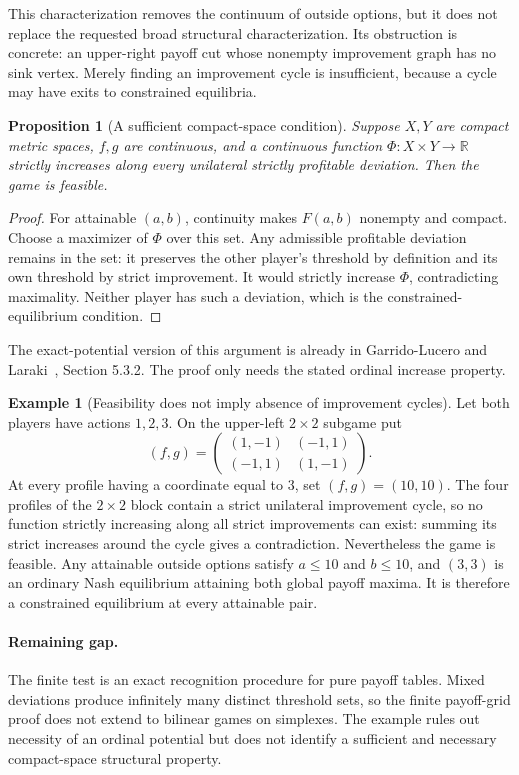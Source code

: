 \documentclass[11pt]{article}
\newtheorem{proposition}{Proposition}
\theoremstyle{definition}
\newtheorem{example}{Example}
\theoremstyle{remark}
\begin{document}
This characterization removes the continuum of outside options, but it does not replace the requested broad structural characterization. Its obstruction is concrete: an upper-right payoff cut whose nonempty improvement graph has no sink vertex. Merely finding an improvement cycle is insufficient, because a cycle may have exits to constrained equilibria.

\begin{proposition}[A sufficient compact-space condition]
Suppose $X,Y$ are compact metric spaces, $f,g$ are continuous, and a continuous function $\Phi:X\times Y\to\mathbb R$ strictly increases along every unilateral strictly profitable deviation. Then the game is feasible.
\end{proposition}
\begin{proof}
For attainable $(a,b)$, continuity makes $F(a,b)$ nonempty and compact. Choose a maximizer of $\Phi$ over this set. Any admissible profitable deviation remains in the set: it preserves the other player's threshold by definition and its own threshold by strict improvement. It would strictly increase $\Phi$, contradicting maximality. Neither player has such a deviation, which is the constrained-equilibrium condition.
\end{proof}

The exact-potential version of this argument is already in Garrido-Lucero and Laraki~\cite{source}, Section 5.3.2. The proof only needs the stated ordinal increase property.

\begin{example}[Feasibility does not imply absence of improvement cycles]
Let both players have actions $1,2,3$. On the upper-left $2\times2$ subgame put
\[
 (f,g)=\begin{pmatrix}(1,-1)&(-1,1)\\(-1,1)&(1,-1)\end{pmatrix}.
\]
At every profile having a coordinate equal to $3$, set $(f,g)=(10,10)$. The four profiles of the $2\times2$ block contain a strict unilateral improvement cycle, so no function strictly increasing along all strict improvements can exist: summing its strict increases around the cycle gives a contradiction. Nevertheless the game is feasible. Any attainable outside options satisfy $a\leq10$ and $b\leq10$, and $(3,3)$ is an ordinary Nash equilibrium attaining both global payoff maxima. It is therefore a constrained equilibrium at every attainable pair.
\end{example}

\paragraph{Remaining gap.}
The finite test is an exact recognition procedure for pure payoff tables. Mixed deviations produce infinitely many distinct threshold sets, so the finite payoff-grid proof does not extend to bilinear games on simplexes. The example rules out necessity of an ordinal potential but does not identify a sufficient and necessary compact-space structural property.
\end{document}
